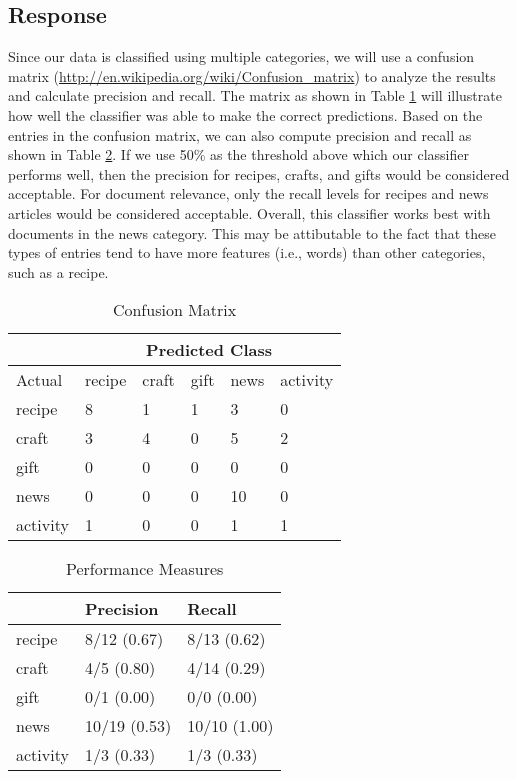 \documentclass[letterpaper,11pt]{report}
\begin{document}
\begin{savenotes}
\subsection{Response}Since our data is classified using multiple categories, we will use a confusion matrix (\small\url{http://en.wikipedia.org/wiki/Confusion_matrix}) to analyze the results and calculate precision and recall. The matrix as shown in Table \ref{tab:confusion} will illustrate how well the classifier was able to make the correct predictions. Based on the entries in the confusion matrix, we can also compute precision and recall as shown in Table \ref{tab:performance}.  If we use 50\% as the threshold above which our classifier performs well, then the precision for recipes, crafts, and gifts would be considered acceptable. For document relevance, only the recall levels for recipes and news articles would be considered acceptable. Overall, this classifier works best with documents in the news category. This may be attibutable to the fact that these types of entries tend to have more features (i.e., words) than other categories, such as a recipe.

\begin{table}[htbp]
\centering
    \begin{tabular}{|p{4cm}|l|l|l|l|l|}
    \hline
						 & \multicolumn{5}{|c|}{Predicted Class} \\ \hline
    Actual   & recipe & craft & gift & news & activity \\ \hline
    recipe   & 8      & 1     & 1    & 3    & 0       \\ \hline
    craft    & 3      & 4     & 0    & 5    & 2       \\ \hline
    gift     & 0      & 0     & 0    & 0    & 0       \\ \hline
    news     & 0      & 0     & 0    & 10   & 0       \\ \hline
    activity & 1      & 0     & 0    & 1    & 1       \\ \hline
    \end{tabular}
    \caption {Confusion Matrix}
			\label{tab:confusion}
\end{table}

\begin{table}[htbp]
\centering
    \begin{tabular}{|p{4cm}|l|l|}
    \hline
    ~        & Precision & Recall \\ \hline
    recipe   & 8/12  (0.67)  & 8/13 (0.62)  \\ \hline
    craft    & 4/5   (0.80)  & 4/14 (0.29)  \\ \hline
    gift     & 0/1   (0.00)  & 0/0  (0.00)  \\ \hline
    news     & 10/19 (0.53)  & 10/10  (1.00)  \\ \hline
    activity & 1/3   (0.33)  & 1/3  (0.33)  \\ \hline
    \end{tabular}
    \caption {Performance Measures}
		\label{tab:performance}
\end{table}

\end{savenotes}
\end{document}
